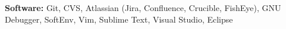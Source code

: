 

\vspace{5pt}

\textbf{Software:} Git, CVS, Atlassian (Jira, Confluence, Crucible, FishEye), GNU Debugger, SoftEnv, Vim, Sublime Text, Visual Studio, Eclipse
